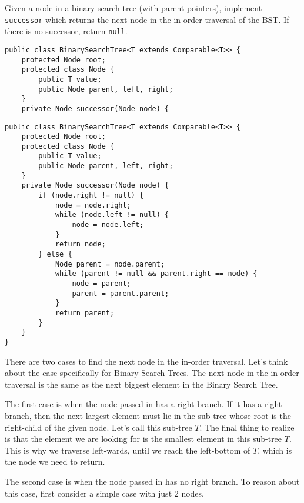 \begin{blocksection}
\question Given a node in a binary search tree (with parent pointers),
implement \lstinline$successor$ which returns the next node in the in-order
traversal of the BST. If there is no successor, return \lstinline$null$.

\ifprintanswers\else
\begin{lstlisting}
public class BinarySearchTree<T extends Comparable<T>> {
    protected Node root;
    protected class Node {
        public T value;
        public Node parent, left, right;
    }
    private Node successor(Node node) {
\end{lstlisting}
\fi
\end{blocksection}

\begin{solution}[2.5in]
\begin{lstlisting}
public class BinarySearchTree<T extends Comparable<T>> {
    protected Node root;
    protected class Node {
        public T value;
        public Node parent, left, right;
    }
    private Node successor(Node node) {
        if (node.right != null) {
            node = node.right;
            while (node.left != null) {
                node = node.left;
            }
            return node;
        } else {
            Node parent = node.parent;
            while (parent != null && parent.right == node) {
                node = parent;
                parent = parent.parent;
            }
            return parent;
        }
    }
}
\end{lstlisting}

There are two cases to find the next node in the in-order traversal. Let's
think about the case specifically for Binary Search Trees. The next node in the
in-order traversal is the same as the next biggest element in the Binary Search
Tree.

The first case is when the node passed in has a right branch. If it has a right
branch, then the next largest element must lie in the sub-tree whose root is
the right-child of the given node. Let's call this sub-tree $T$. The final
thing to realize is that the element we are looking for is the smallest element
in this sub-tree $T$. This is why we traverse left-wards, until we reach the
left-bottom of $T$, which is the node we need to return.

The second case is when the node passed in has no right branch. To reason about
this case, first consider a simple case with just 2 nodes.

\begin{center}
\begin{tikzpicture}[very thick,level/.style={sibling distance=20mm/#1},level distance=30pt]


\end{tikzpicture}
\end{center}
\end{solution}
